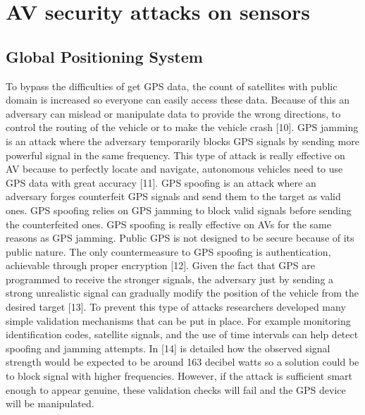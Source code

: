 \section{AV security attacks on sensors}

\subsection{Global Positioning System}
    To bypass the difficulties of get GPS data, the count of satellites with public domain is increased so everyone can easily access these data. Because of this an adversary can mislead or manipulate data to provide the wrong directions, to control the routing of the 
    vehicle or to make the vehicle crash [10].
    \newline
    GPS jamming is an attack where the adversary temporarily blocks GPS signals by sending more powerful signal in the same frequency. This type of attack is really effective on AV because to perfectly locate and navigate, autonomous vehicles need to use GPS data with great accuracy [11]. 
    GPS spoofing is an attack where an adversary forges counterfeit GPS signals and send them to the target as valid ones. 
    \newline    
    GPS spoofing relies on GPS jamming to block valid signals before sending the counterfeited ones. GPS spoofing is really effective on AVs for the same reasons  as  GPS  jamming.  Public  GPS  is  not  designed  to  be secure because of its public nature. The only countermeasure to GPS spoofing is authentication, achievable through proper encryption [12].
    \newline    
    Given the fact that GPS are programmed to receive the stronger signals, the adversary  just by sending a strong unrealistic signal can gradually modify the position of the vehicle from the desired target [13]. 
    \newline    
    To prevent this type of attacks researchers developed many simple validation mechanisms that can be put in place. For example monitoring identification codes, satellite signals, and the use of time intervals can help detect spoofing and jamming attempts. 
    \newline    
    In [14]  is detailed how the observed signal strength would be expected to be around 163 decibel watts so a solution could be to block signal with higher frequencies. However, if the attack is sufficient smart enough to appear genuine, these validation checks will fail and the GPS device will be manipulated. 
